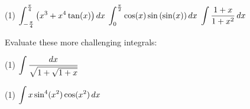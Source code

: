 \documentclass[answers]{exam}
\begin{document}
  \begin{tasks}[after-item-skip=\stretch{1}, resume](1)
    \task $\displaystyle\int_{-\frac{\pi}{4}}^{\frac{\pi}{4}} {\left(x^3+x^4\tan(x)\right)}\,dx$
    \task $\displaystyle\int_{0}^{\frac{\pi}{2}} \cos(x)\sin{\left(\sin(x)\right)}\,dx$
    \task $\displaystyle\int \frac{1+x}{1+x^2}\,dx$
  \end{tasks}
  \pagebreak

  \noindent
  \begin{ex*}
    Evaluate these more challenging integrals:
  \end{ex*}
  \begin{tasks}[after-item-skip=\stretch{1}](1)
    \task $\displaystyle\int \frac{dx}{\sqrt{1+\sqrt{1+x}}}$
  \end{tasks}
  \pagebreak  
  
  \begin{tasks}[after-item-skip=\stretch{1}, resume](1)
    \task $\displaystyle\int x\sin^4(x^2)\cos(x^2)\,dx$
  \end{tasks}
  \pagebreak  
\end{document}
